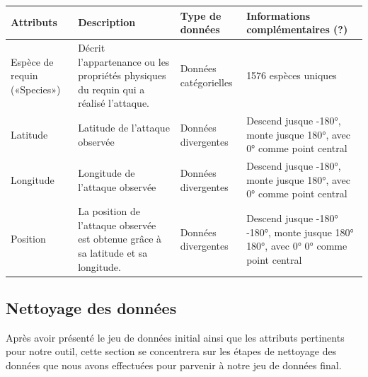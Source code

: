 \documentclass{article}
\begin{document}
\begin{table}[h]
	\centering
	\begin{tabular}{|m{1.9cm}|m{4cm}|m{3.3cm}|m{3.5cm}|}
		\hline
		Attributs                    & Description                                                                          & Type de données       & Informations complémentaires (?)                                                                                 \\ \hline
		Espèce de requin («Species») & Décrit l’appartenance ou les propriétés physiques du requin qui a réalisé l’attaque. & Données catégorielles & 1576 espèces uniques                                                                                             \\ \hline
		Latitude                     & Latitude de l’attaque observée                                                       & Données divergentes   & Descend jusque \ang{-180}, monte jusque \ang{180}, avec \ang{0} comme point central                              \\ \hline
		Longitude                    & Longitude de l’attaque observée                                                      & Données divergentes   & Descend jusque \ang{-180}, monte jusque \ang{180}, avec \ang{0} comme point central                              \\ \hline
		Position                     & La position de l’attaque observée est obtenue grâce à sa latitude et sa longitude.   & Données divergentes   & Descend jusque \ang{-180} \ang{-180}, monte jusque \ang{180} \ang{180}, avec \ang{0} \ang{0} comme point central \\ \hline
	\end{tabular}
\end{table}

\clearpage
\subsection{Nettoyage des données}
Après avoir présenté le jeu de données initial ainsi que les attributs pertinents pour notre outil, cette section se concentrera sur les étapes de nettoyage des données que nous avons effectuées pour parvenir à notre jeu de données final.
\end{document}
